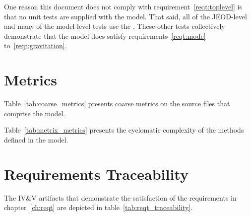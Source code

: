 \label{inspect:extern_tests}
One reason this document does not comply with requirement~\ref{reqt:toplevel}
is that no unit tests are supplied with the model.
That said, all of the JEOD-level and many of the model-level tests
use the \ModelDesc. These other tests collectively demonstrate
that the model does satisfy
requirements~\ref{reqt:mode}
to~\ref{reqt:gravitation}.

\section{Metrics}
Table~\ref{tab:coarse_metrics} presents coarse metrics on the source
files that comprise the model.



Table~\ref{tab:metrix_metrics} presents the cyclomatic complexity of the 
methods defined in the model.



\section{Requirements Traceability}

The IV\&V artifacts that demonstrate the satisfaction of the requirements
in chapter~\ref{ch:reqt} are depicted in
table~\ref{tab:reqt_traceability}.

